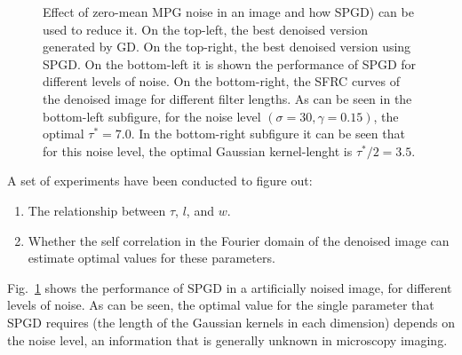\documentclass{article}
\begin{document}
\begin{figure}
  \centering
  \caption{Effect of zero-mean MPG noise in an image and how SPGD)
    can be used to reduce it. On the top-left, the best
    denoised version generated by GD. On the top-right, the best denoised version using
    SPGD. On the bottom-left it is shown the performance
    of SPGD for different levels of noise. On the bottom-right, the SFRC curves
    of the denoised image for different filter lengths. As can be seen
    in the bottom-left subfigure, for the noise level $(\sigma=30,
    \gamma=0.15)$, the optimal $\tau^*=7.0$. In the bottom-right
    subfigure it can be seen that for this noise level, the optimal
    Gaussian kernel-lenght is $\tau^*/2=3.5$.
    \label{fig:SPGD_0MMPG}}
\end{figure}

A set of experiments have been conducted to figure out:
\begin{enumerate}
\item The relationship between $\tau$, $l$, and $w$.
\item Whether the self correlation in the Fourier domain of the
  denoised image can estimate optimal values for these parameters.
\end{enumerate}

Fig.~\ref{fig:SPGD_0MMPG} shows the performance of SPGD in a artificially
noised image, for different levels of noise. As can be seen, the
optimal value for the single parameter that SPGD requires (the length of
the Gaussian kernels in each dimension) depends on the noise level, an
information that is generally unknown in microscopy imaging.
\end{document}
